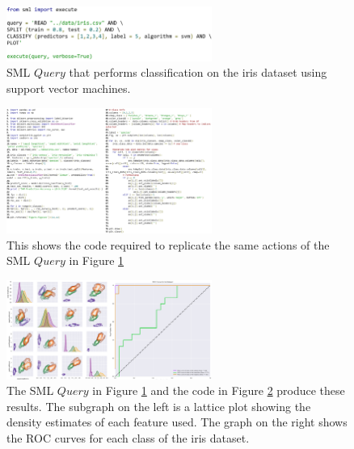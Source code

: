 \documentclass[jair,twoside,11pt,theapa]{article}
\begin{document}
\begin{figure}
\includegraphics[width=0.6\textwidth]{figs/iris_sml.png}
\centering
\caption{SML \(Query\) that performs classification on the iris dataset using support vector machines.}
\label{fig:SML:IrisQuery}
\end{figure}

\begin{figure}
\includegraphics[width=0.6\textwidth]{figs/iris_manual.png}
\centering
\caption{This shows the code required to replicate the same actions of the SML \(Query\) in Figure \ref{fig:SML:IrisQuery}}
\label{fig:Manual:IrisCode}
\end{figure}

\begin{figure}
\includegraphics[width=0.6\textwidth]{figs/iris_results.png}
\centering
\caption{The SML \(Query\) in Figure \ref{fig:SML:IrisQuery} and the code in Figure \ref{fig:Manual:IrisCode} produce these results. The subgraph on the left is a lattice plot showing the density estimates of each feature used. The graph on the right shows the ROC curves for each class of the iris dataset.}
\label{fig:IrisResults}
\end{figure}
\end{document}
